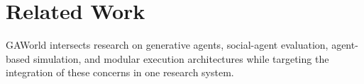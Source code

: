 \section{Related Work}
GAWorld intersects research on generative agents, social-agent evaluation, agent-based simulation, and
modular execution architectures while targeting the integration of these concerns in one research system.
